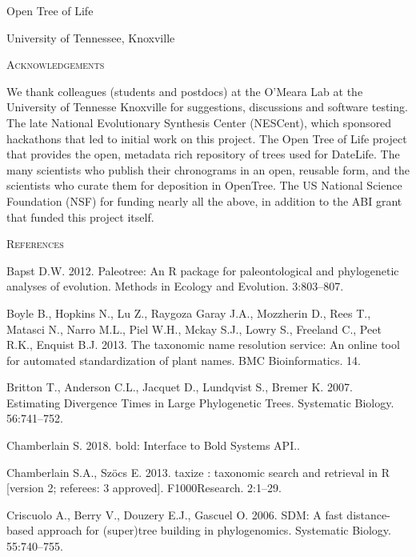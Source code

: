 \documentclass[]{article}
\begin{document}
Open Tree of Life

University of Tennessee, Knoxville

\begin{center}
\textsc{Acknowledgements}
\end{center}

We thank colleagues (students and postdocs) at the O'Meara Lab at the University
of Tennesse Knoxville for suggestions, discussions and software testing.
The late National Evolutionary Synthesis Center (NESCent), which sponsored hackathons
that led to initial work on this project.
The Open Tree of Life project that provides the open, metadata rich repository of
trees used for DateLife.
The many scientists who publish their chronograms in an open, reusable form, and
the scientists who curate them for deposition in OpenTree.
The US National Science Foundation (NSF) for funding nearly all the above, in addition
to the ABI grant that funded this project itself.

\newpage

\begin{center}
\textsc{References}
\end{center}

\hypertarget{refs}{}
\leavevmode\hypertarget{ref-Bapst2012a}{}%
Bapst D.W. 2012. Paleotree: An R package for paleontological and phylogenetic analyses of evolution. Methods in Ecology and Evolution. 3:803--807.

\leavevmode\hypertarget{ref-Boyle2013}{}%
Boyle B., Hopkins N., Lu Z., Raygoza Garay J.A., Mozzherin D., Rees T., Matasci N., Narro M.L., Piel W.H., Mckay S.J., Lowry S., Freeland C., Peet R.K., Enquist B.J. 2013. The taxonomic name resolution service: An online tool for automated standardization of plant names. BMC Bioinformatics. 14.

\leavevmode\hypertarget{ref-Britton2007}{}%
Britton T., Anderson C.L., Jacquet D., Lundqvist S., Bremer K. 2007. Estimating Divergence Times in Large Phylogenetic Trees. Systematic Biology. 56:741--752.

\leavevmode\hypertarget{ref-Chamberlain2018}{}%
Chamberlain S. 2018. bold: Interface to Bold Systems API..

\leavevmode\hypertarget{ref-Chamberlain2013}{}%
Chamberlain S.A., Szöcs E. 2013. taxize : taxonomic search and retrieval in R {[}version 2; referees: 3 approved{]}. F1000Research. 2:1--29.

\leavevmode\hypertarget{ref-Criscuolo2006}{}%
Criscuolo A., Berry V., Douzery E.J., Gascuel O. 2006. SDM: A fast distance-based approach for (super)tree building in phylogenomics. Systematic Biology. 55:740--755.
\end{document}
